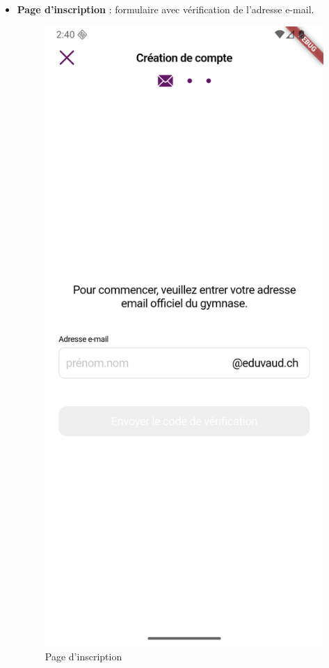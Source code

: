 \documentclass[12pt]{report}
\begin{document}
\begin{itemize}
	\item \textbf{Page d'inscription} : formulaire avec vérification de l’adresse e-mail.
	
	\begin{figure}[H]
		\centering
		\begin{minipage}[t]{0.5\textwidth}
			\centering
			\includegraphics[width=\textwidth]{img/registration_email.png}
			\caption{Page d'inscription}
		\end{minipage}
	\end{figure}
	

\end{itemize}
\end{document}
